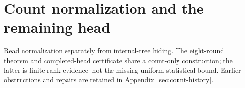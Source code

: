 \section{Count normalization and the remaining head}\label{sec:counts}

Read normalization separately from internal-tree hiding. The eight-round theorem and completed-head certificate share a count-only construction; the latter is finite rank evidence, not the missing uniform statistical bound. Earlier obstructions and repairs are retained in Appendix~\ref{sec:count-history}.












